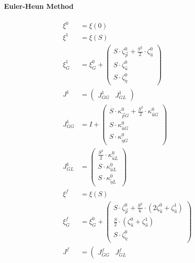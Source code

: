 \documentclass[review]{elsarticle}
\begin{document}
\paragraph{Euler-Heun Method}
\begin{equation} \begin{alignedat}{-1}
    \xi^{0}&=\xi\left(0\right) \\
    \xi^{1}&=\xi\left(S\right) \\
    \xi_{G}^{1}&=\xi_{G}^{0}+\left(\begin{array}{l}
        S\cdot\zeta_{\vec{p}}^{0}+\frac{S^{2}}{2}\cdot\zeta_{\hat{u}}^{0}\\
        S\cdot\zeta_{\hat{u}}^{0}\\
        S\cdot\zeta_{\tilde{\eta}}^{0}
    \end{array}\right) \\
    J^{1}&=\left(\begin{array}{cc}
        J_{GG}^{1} & J_{GL}^{1}
    \end{array}\right) \\
    J_{GG}^{1}&=I+\left(\begin{array}{l}
        S\cdot\kappa_{\vec{p}G}^{0}+\frac{S^{2}}{2}\cdot\kappa_{\hat{u}G}^{0}\\
        S\cdot\kappa_{\hat{u}G}^{0}\\
        S\cdot\kappa_{\tilde{\eta}G}^{0}
    \end{array}\right)\\
    J_{GL}^{1}&=\left(\begin{array}{l}
        \frac{S^{2}}{2}\cdot\kappa_{\hat{u}L}^{0}\\
        S\cdot\kappa_{\hat{u}L}^{0}\\
        S\cdot\kappa_{\tilde{\eta}L}^{0}
    \end{array}\right) \\
    \xi^{f}&=\xi\left(S\right) \\
    \xi_{G}^{f}&=\xi_{G}^{0}+\left(\begin{array}{l}
        S\cdot\zeta_{\vec{p}}^{0}+\frac{S^{2}}{6}\cdot\left(2\zeta_{\hat{u}}^{0}+\zeta_{\hat{u}}^{1}\right)\\
        \frac{S}{2}\cdot\left(\zeta_{\hat{u}}^{0}+\zeta_{\hat{u}}^{1}\right)\\
        S\cdot\zeta_{\tilde{\eta}}^{0}
    \end{array}\right) \\
    J^{f}&=\left(\begin{array}{cc}
        J_{GG}^{f} & J_{GL}^{f}

\end{array}
\end{alignedat}
\end{equation}
\end{document}
